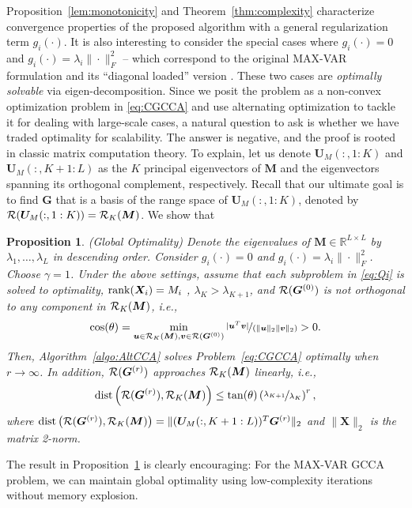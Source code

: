 \documentclass[10pt,journal]{IEEEtran}
\newtheorem{Prop}{Proposition}
\begin{document}
Proposition~\ref{lem:monotonicity} and Theorem~\ref{thm:complexity} characterize convergence properties of the proposed algorithm with a general regularization term $g_i(\cdot)$.
It is also interesting to consider the special cases where $g_i(\cdot)=0$ and $g_i(\cdot)=\lambda_i\|\cdot\|_F^2$ -- which correspond to the original MAX-VAR formulation and its ``diagonal loaded'' version \cite{rastogimultiview}.
These two cases are \emph{optimally solvable} via eigen-decomposition.
Since we posit the problem as a non-convex optimization problem in \eqref{eq:CGCCA} and use alternating optimization to tackle it for dealing with large-scale cases, a natural question to ask is whether we have traded optimality for scalability.
The answer is negative, and the proof is rooted in classic matrix computation theory. 
To explain, let us denote ${\bm U}_M(:,1:K)$ and ${\bm U}_M(:,K+1:L)$ as the $K$ principal eigenvectors of ${\bm M}$ and the eigenvectors spanning its orthogonal complement, respectively.
Recall that our ultimate goal is to find ${\bm G}$ that is a basis of the range space of ${\bm U}_M(:,1:K)$, denoted by ${\cal R}({\bm U}_M(:,1:K))={\cal R}_K({\bm M})$.
We show that
\begin{Prop} \label{thm:main} ({Global Optimality})
   Denote the eigenvalues of ${\bm M}\in\mathbb{R}^{L\times L}$ by $\lambda_1,\ldots,\lambda_L$ in descending order. 
   Consider $g_i(\cdot)=0$ and $g_i(\cdot)=\lambda_i\|\cdot\|_F^2$. Choose $\gamma = 1$.
   Under the above settings, assume that each subproblem in \eqref{eq:Qi} is solved to optimality, ${\rm rank}({\bm X}_i)=M_i$ , $\lambda_K>\lambda_{K+1}$, and ${\cal R}({\bm G}^{(0)})$ is not orthogonal to any component in ${\cal R}_K({\bm M})$, i.e., 
   \[\cos(\theta) = \min_{{\bm u}\in{\cal R}_K({\bm M}), {\bm v}\in{\cal R}({\bm G}^{(0)})}\nicefrac{|{\bm u}^T{\bm v}|}{(\|{\bm u}\|_2\|{\bm v}\|_2)}>0.\]
   Then, Algorithm~\eqref{algo:AltCCA} solves Problem~\eqref{eq:CGCCA} optimally when $r\rightarrow \infty$. In addition,
   ${\cal R}({\bm G}^{(r)})$ approaches ${\cal R}_K({\bm M})$ linearly, i.e.,
   \[ {\rm dist}\left({\cal R}({\bm G}^{(r)}),{\cal R}_K({\bm M})\right)\leq \tan(\theta)\left(\nicefrac{\lambda_{K+1}}{\lambda_K}\right)^r,\]
   where $ {\rm dist}\left({\cal R}({\bm G}^{(r)}),{\cal R}_K({\bm M})
   \right) = \|({\bm U}_M(:,K+1:L))^T{\bm G}^{(r)}\|_2$ and $\|{\bm X}\|_2$ is the matrix 2-norm.
\end{Prop}
The result in Proposition~\ref{thm:main} is clearly encouraging: For the MAX-VAR GCCA problem, we can maintain global optimality using low-complexity iterations without memory explosion.
\end{document}
